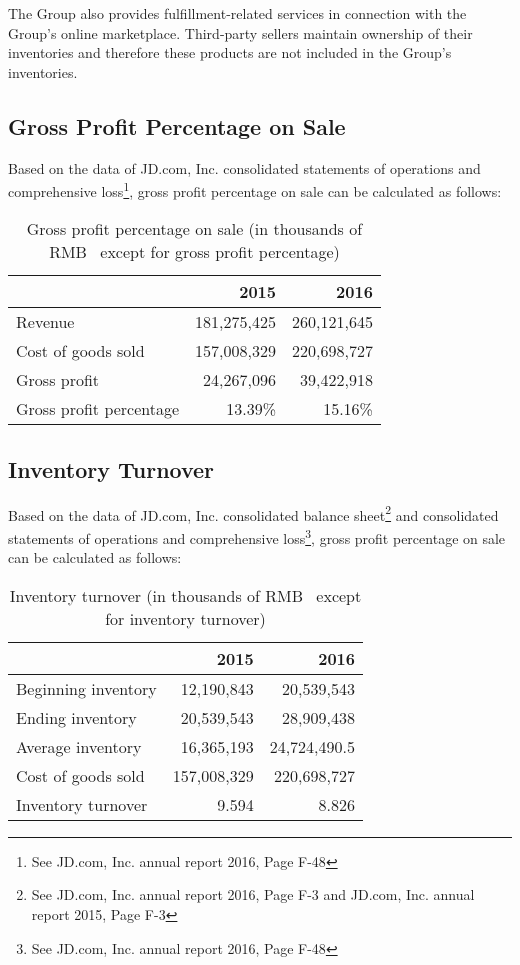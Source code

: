 The Group also provides fulfillment-related services in connection with the Group’s online marketplace. Third-party sellers maintain ownership of their
inventories and therefore these products are not included in the Group’s inventories.
\subsection{Gross Profit Percentage on Sale}

Based on the data of JD.com, Inc. consolidated statements of operations and comprehensive loss\footnote{See JD.com, Inc. annual report 2016, Page F-48}, gross profit percentage on sale can be calculated as follows:

\begin{table}[H]	
	\begin{center}
		\begin{tabular}{lrr}
			\toprule
			&\textbf{2015}&\textbf{2016}\\
			\midrule
			Revenue&181,275,425&260,121,645\\
			Cost of goods sold&157,008,329&220,698,727\\
			Gross profit&24,267,096&39,422,918\\
			Gross profit percentage&13.39\%&15.16\%\\
			\bottomrule
		\end{tabular}
	\end{center}
	\caption{Gross profit percentage on sale (in thousands of RMB \textyen\ except for gross profit percentage)}\label{table:1}
\end{table}

\subsection{Inventory Turnover}
Based on the data of JD.com, Inc. consolidated balance sheet\footnote{See JD.com, Inc. annual report 2016, Page F-3 and JD.com, Inc. annual report 2015, Page F-3} and consolidated statements of operations and comprehensive loss\footnote{See JD.com, Inc. annual report 2016, Page F-48}, gross profit percentage on sale can be calculated as follows:

\begin{table}[H]	
	\begin{center}
		\begin{tabular}{lrr}
			\toprule
			&\textbf{2015}&\textbf{2016}\\
			\midrule
			Beginning inventory &12,190,843&20,539,543\\
			Ending inventory  &20,539,543&28,909,438\\
			Average inventory &16,365,193&24,724,490.5\\
			Cost of goods sold &157,008,329&220,698,727\\
			Inventory turnover &9.594&8.826\\
			\bottomrule
		\end{tabular}
	\end{center}
	\caption{Inventory turnover (in thousands of RMB \textyen\ except for inventory turnover)}\label{table:1}
\end{table}

